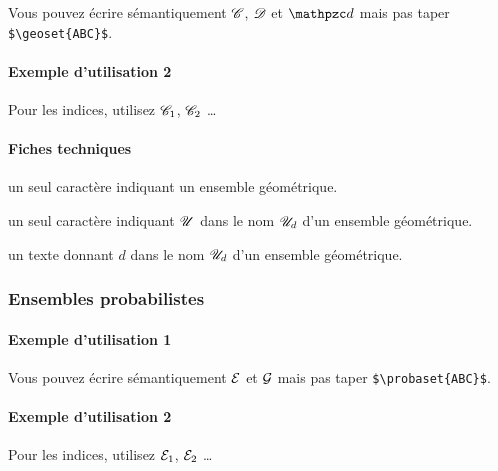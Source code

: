 \documentclass[12pt,a4paper]{article}
\begin{document}
\begin{tcblisting}{}
Vous pouvez écrire sémantiquement $\geoset{C}$, $\geoset{D}$ et $\geoset{d}$ mais pas
taper \verb+$\geoset{ABC}$+.
\end{tcblisting}


            \paragraph{Exemple d'utilisation 2}

\begin{tcblisting}{}
Pour les indices, utilisez $\geoset*{C}{1}$, $\geoset*{C}{2}$ \dots
\end{tcblisting}


            \paragraph{Fiches techniques}


\IDarg{} un seul caractère \ascii{} indiquant un ensemble géométrique.


\bigskip



 un seul caractère \ascii{} indiquant $\geoset{U}$ dans le nom $\geoset*{U}{d}$ d'un ensemble géométrique.

 un texte donnant $d$ dans le nom $\geoset*{U}{d}$ d'un ensemble géométrique.


        \subsubsection{Ensembles probabilistes}

            \paragraph{Exemple d'utilisation 1}

\begin{tcblisting}{}
Vous pouvez écrire sémantiquement $\probaset{E}$ et $\probaset{G}$ mais pas taper
\verb+$\probaset{ABC}$+.
\end{tcblisting}


            \paragraph{Exemple d'utilisation 2}

\begin{tcblisting}{}
Pour les indices, utilisez $\probaset*{E}{1}$, $\probaset*{E}{2}$ \dots
\end{tcblisting}
\end{document}
